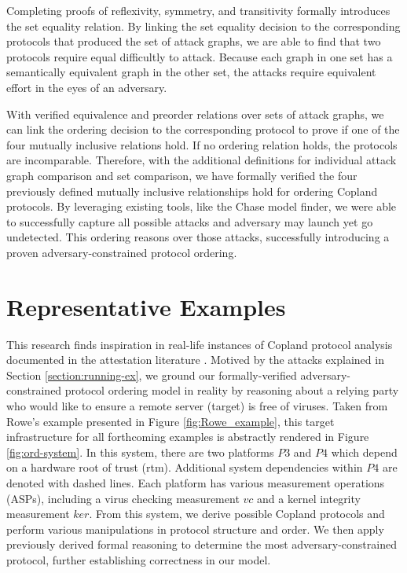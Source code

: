 \documentclass[runningheads]{llncs}
\theoremstyle{definition}
\begin{document}
\noindent Completing proofs of reflexivity, symmetry, and transitivity formally introduces the set equality relation. By linking the set equality decision to the corresponding protocols that produced the set of attack graphs, we are able to find that two protocols require equal difficultly to attack. Because each graph in one set has a semantically equivalent graph in the other set, the attacks require equivalent effort in the eyes of an adversary. 

With verified equivalence and preorder relations over sets of attack graphs, we can link the ordering decision to the corresponding protocol to prove if one of the four mutually inclusive relations hold. If no ordering relation holds, the protocols are incomparable. Therefore, with the additional definitions for individual attack graph comparison and set comparison, we have formally verified the four previously defined mutually inclusive relationships hold for ordering Copland protocols. By leveraging existing tools, like the Chase model finder, we were able to successfully capture all possible attacks and adversary may launch yet go undetected. This ordering reasons over those attacks, successfully introducing a proven adversary-constrained protocol ordering. 

\section{Representative Examples}


This research finds inspiration in real-life instances of Copland protocol analysis documented in the attestation literature \cite{Rowe:2021:OnOrdering,Coker::Principles-of-R}. Motived by the attacks explained in Section \ref{section:running-ex}, we ground our formally-verified adversary-constrained protocol ordering model in reality by reasoning about a relying party who would like to ensure a remote server (target) is free of viruses. Taken from Rowe's \cite{Rowe:2016:Confining} example presented in Figure \ref{fig:Rowe_example}, this target infrastructure for all forthcoming examples is abstractly rendered in Figure \ref{fig:ord-system}. In this system, there are two platforms $P3$ and $P4$ which depend on a hardware root of trust (rtm). Additional system dependencies within $P4$ are denoted with dashed lines.  Each platform has various measurement operations (ASPs), including a virus checking measurement $vc$ and a kernel integrity measurement $ker$. From this system, we derive possible Copland protocols and perform various manipulations in protocol structure and order. We then apply previously derived formal reasoning to determine the most adversary-constrained protocol, further establishing correctness in our model.
\end{document}
